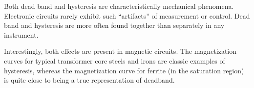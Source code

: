 Both dead band and hysteresis are characteristically mechanical phenomena.  Electronic circuits rarely exhibit such ``artifacts'' of measurement or control.  Dead band and hysteresis are more often found together than separately in any instrument.

Interestingly, both effects are present in magnetic circuits.  The magnetization curves for typical transformer core steels and irons are classic examples of hysteresis, whereas the magnetization curve for ferrite (in the saturation region) is quite close to being a true representation of deadband.











